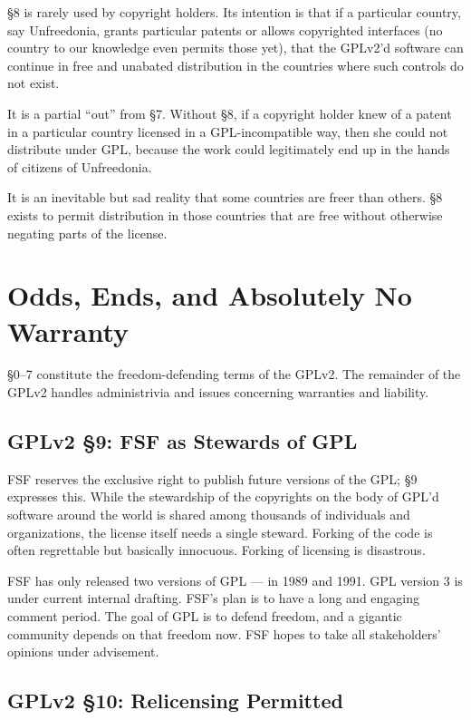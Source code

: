 \S 8 is rarely used by copyright holders. Its intention is that if a
particular country, say Unfreedonia, grants particular patents or allows
copyrighted interfaces (no country to our knowledge even permits those
yet), that the GPLv2'd software can continue in free and unabated
distribution in the countries where such controls do not exist.

It is a partial ``out'' from \S 7. Without \S 8, if a copyright holder
knew of a patent in a particular country licensed in a GPL-incompatible
way, then she could not distribute under GPL, because the work could
legitimately end up in the hands of citizens of Unfreedonia.

It is an inevitable but sad reality that some countries are freer than
others. \S 8 exists to permit distribution in those countries that are
free without otherwise negating parts of the license.

\chapter{Odds, Ends, and Absolutely No Warranty}

\S 0--7 constitute the freedom-defending terms of the GPLv2. The remainder
of the GPLv2 handles administrivia and issues concerning warranties and
liability.

\section{GPLv2 \S 9: FSF as Stewards of GPL}
\label{GPLs9}

FSF reserves the exclusive right to publish future versions of the GPL\@;
\S 9 expresses this. While the stewardship of the copyrights on the body
of GPL'd software around the world is shared among thousands of
individuals and organizations, the license itself needs a single steward.
Forking of the code is often regrettable but basically innocuous. Forking
of licensing is disastrous.

FSF has only released two versions of GPL --- in 1989 and 1991. GPL
version 3 is under current internal drafting. FSF's plan is to have a
long and engaging comment period. The goal of GPL is to defend freedom, and
a gigantic community depends on that freedom now. FSF hopes to take all
stakeholders' opinions under advisement.

\section{GPLv2 \S 10: Relicensing Permitted}
\label{GPLs10}

